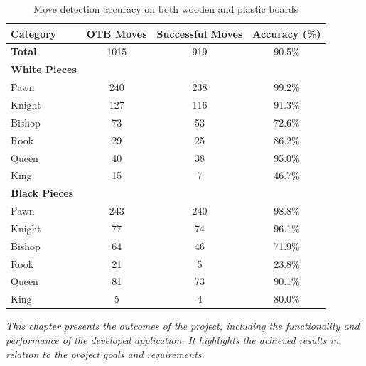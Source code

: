 \begin{table}[htbp]
\centering
\caption{Move detection accuracy on both wooden and plastic boards}
\begin{tabular}{lccc}
\toprule
\textbf{Category} & \textbf{OTB Moves} & \textbf{Successful Moves} & \textbf{Accuracy (\%)} \\
\midrule
\textbf{Total} & 1015 & 919 & 90.5\% \\
\midrule
\textbf{White Pieces} & & & \\
\hspace{1em}Pawn  & 240 & 238 & 99.2\% \\
\hspace{1em}Knight & 127 & 116 & 91.3\% \\
\hspace{1em}Bishop & 73  & 53  & 72.6\% \\
\hspace{1em}Rook   & 29  & 25  & 86.2\% \\
\hspace{1em}Queen  & 40  & 38  & 95.0\% \\
\hspace{1em}King   & 15  & 7   & 46.7\% \\
\midrule
\textbf{Black Pieces} & & & \\
\hspace{1em}Pawn  & 243 & 240 & 98.8\% \\
\hspace{1em}Knight & 77  & 74  & 96.1\% \\
\hspace{1em}Bishop & 64  & 46  & 71.9\% \\
\hspace{1em}Rook   & 21  & 5   & 23.8\% \\
\hspace{1em}Queen  & 81  & 73  & 90.1\% \\
\hspace{1em}King   & 5   & 4   & 80.0\% \\
\bottomrule
\end{tabular}
\end{table}






\begin{center}
    \textit{This chapter presents the outcomes of the project, including the functionality and performance of the developed application. It highlights the achieved results in relation to the project goals and requirements.}
\end{center}

